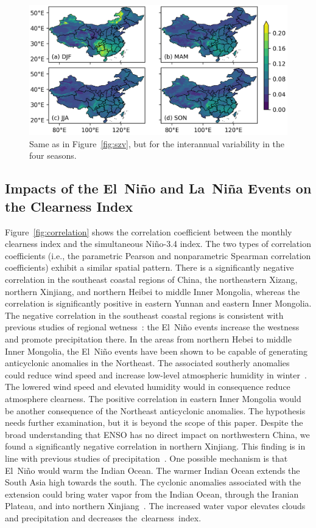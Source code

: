 \documentclass[atmosphere,article,accept,pdftex,moreauthors]{Definitions/mdpi}
\begin{document}
\begin{figure}[H]
  \includegraphics[width=14cm]{fig/iav.png}
  \caption{Same as in Figure~\ref{fig:szv}, but for the interannual variability in the four seasons. \label{fig:iav}}
\end{figure}

\subsection{Impacts of the El~Niño and La~Niña Events on the Clearness Index}\label{sec:clearnessindexanomalies}

Figure~\ref{fig:correlation} shows the correlation coefficient between the monthly clearness index and the simultaneous Niño-3.4 index. The two types of correlation coefficients (i.e., the parametric Pearson and nonparametric Spearman correlation coefficients) exhibit a similar spatial pattern. There is a significantly negative correlation in the southeast coastal regions of China, the northeastern Xizang, northern Xinjiang, and northern Heibei to middle Inner Mongolia, whereas the correlation is significantly positive in eastern Yunnan and eastern Inner Mongolia. The negative correlation in the southeast coastal regions is consistent with previous studies of regional wetness~\cite{wang2017IJC}: the El~Niño events increase the westness and promote precipitation there. In the areas from northern Hebei to middle Inner Mongolia, the El~Niño events have been shown to be capable of generating anticyclonic anomalies in the Northeast. The associated southerly anomalies could reduce wind speed and increase low-level atmospheric humidity in winter~\cite{zhao2022JC}. The lowered wind speed and elevated humidity would in consequence reduce atmosphere clearness. The positive correlation in eastern Inner Mongolia would be another consequence of the Northeast anticyclonic anomalies. The hypothesis needs further examination, but it is beyond the scope of this paper. Despite the broad understanding that ENSO has no direct impact on northwestern China, we found a significantly negative correlation in northern Xinjiang. This finding is in line with previous studies of precipitation~\cite{lu2019ASL}. One possible mechanism is that El~Niño would warm the Indian Ocean. The warmer Indian Ocean extends the South Asia high towards the south. The cyclonic anomalies associated with the extension could bring water vapor from the Indian Ocean, through the Iranian Plateau, and into northern Xinjiang~\cite{lu2019ASL}. The increased water vapor elevates clouds and precipitation and decreases \mbox{the clearness index}.
\end{document}
